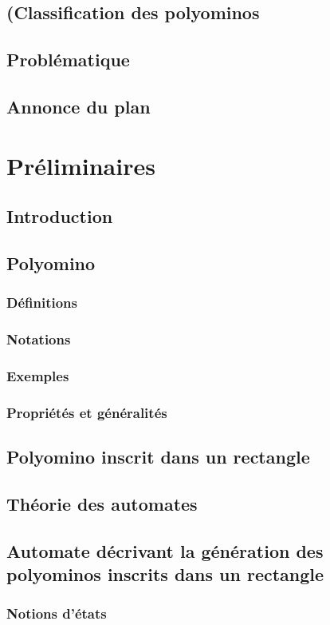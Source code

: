 \documentclass[12pt]{memoireuqam1.3}
\begin{document}
\section{(Classification des polyominos}
\section{Problématique}
\section{Annonce du plan}
\chapter{Préliminaires}
\section*{Introduction}
\section{Polyomino}
\subsection{Définitions}
\subsection{Notations}
\subsection{Exemples}
\subsection{Propriétés et généralités}
\section{Polyomino inscrit dans un rectangle}
\section{Théorie des automates}
\section{Automate décrivant la génération des polyominos inscrits dans un rectangle}
\subsection{Notions d'états}
\end{document}
